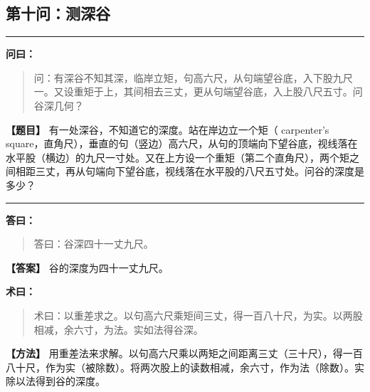 \documentclass[11pt,a4paper]{article}
\newenvironment{mathproblem}[1][]{%
  \medskip\noindent\rule{\textwidth}{0.4pt}%
  \par\noindent{\Large\bfseries\color{sectioncolor}#1}\par\nopagebreak%
  \smallskip%
}{%
  \par\noindent\rule{\textwidth}{0.4pt}\medskip%
}
\newcommand{\wenlabel}{\textbf{\color{origcolor}问曰：}}
\newcommand{\dalabel}{\textbf{\color{origcolor}答曰：}}
\newcommand{\shulabel}{\textbf{\color{origcolor}术曰：}}
\newcommand{\modwenlabel}{\textbf{\color{modcolor}【题目】}}
\newcommand{\moddalabel}{\textbf{\color{modcolor}【答案】}}
\newcommand{\modshulabel}{\textbf{\color{modcolor}【方法】}}
\begin{document}
\subsection*{第十问：测深谷}

\begin{mathproblem}[\textbf{第十问：测深谷}]

\begin{originaltext}
\wenlabel
\begin{quote}
\textcolor{origcolor}{%
问：有深谷不知其深，临岸立矩，句高六尺，从句端望谷底，入下股九尺一。又设重矩于上，其间相去三丈，更从句端望谷底，入上股八尺五寸。问谷深几何？
}
\end{quote}
\end{originaltext}

\begin{moderntext}
\modwenlabel
有一处深谷，不知道它的深度。站在岸边立一个矩（ carpenter's square，直角尺），垂直的句（竖边）高六尺，从句的顶端向下望谷底，视线落在水平股（横边）的九尺一寸处。又在上方设一个重矩（第二个直角尺），两个矩之间相距三丈，再从句端向下望谷底，视线落在水平股的八尺五寸处。问谷的深度是多少？
\end{moderntext}

\end{mathproblem}

\begin{originaltext}
\dalabel
\begin{quote}
\textcolor{origcolor}{%
答曰：谷深四十一丈九尺。
}
\end{quote}
\end{originaltext}

\begin{moderntext}
\moddalabel
谷的深度为四十一丈九尺。
\end{moderntext}

\begin{originaltext}
\shulabel
\begin{quote}
\textcolor{origcolor}{%
术曰：以重差求之。以句高六尺乘矩间三丈，得一百八十尺，为实。以两股相减，余六寸，为法。实如法得谷深。
}
\end{quote}
\end{originaltext}

\begin{moderntext}
\modshulabel
用重差法来求解。以句高六尺乘以两矩之间距离三丈（三十尺），得一百八十尺，作为实（被除数）。将两次股上的读数相减，余六寸，作为法（除数）。实除以法得到谷的深度。
\end{moderntext}
\end{document}
